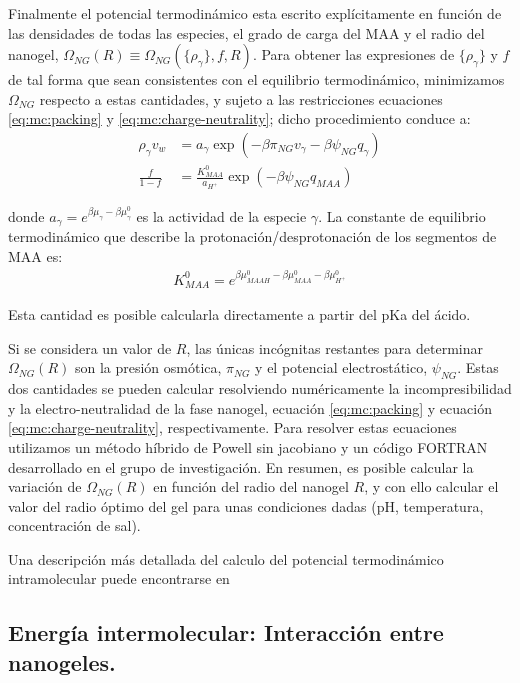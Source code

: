 	
	Finalmente el potencial termodin\'amico esta escrito expl\'icitamente en funci\'on de las densidades de todas las especies, el grado de carga del MAA y el radio del nanogel, $\Omega_{NG}(R)\equiv\Omega_{NG}(\{\rho_\gamma\},f,R)$.
	Para obtener las expresiones de $\{\rho_\gamma\}$ y $f$ de tal forma que sean consistentes con el equilibrio termodin\'amico, minimizamos $\Omega_{NG}$ respecto a estas cantidades, y  sujeto a las restricciones ecuaciones  \ref{eq:mc:packing} y  \ref{eq:mc:charge-neutrality}; dicho procedimiento conduce a: 
	\begin{align}
		\rho_\gamma v_w &= a_\gamma \exp(-\beta\pi_{NG}v_\gamma -\beta\psi_{NG}q_{\gamma})\\
		\frac{f}{1-f}&= \frac{K^0_{MAA}}{a_{H^+}}\exp(-\beta\psi_{NG}q_{MAA})\label{eq:mc:fcharge}
	\end{align}
	
	\noindent donde $a_\gamma = e^{\beta\mu_\gamma-\beta\mu_\gamma^0}$ es la actividad de la especie $\gamma$. 
	La constante de equilibrio termodin\'amico que describe la protonaci\'on/desprotonaci\'on de los segmentos de MAA es:
	\begin{align}
		K^0_{MAA}= e^{\beta\mu^0_{MAAH}-\beta\mu^0_{MAA}-\beta\mu^0_{H^+}}
	\end{align}
	
	\noindent Esta cantidad es posible calcularla directamente a partir del pKa del \'acido.
	
	
	Si se considera  un valor de  $R$, las \'unicas inc\'ognitas restantes para determinar $\Omega_{NG}(R)$ son la presi\'on osm\'otica, $\pi_{NG}$ y el potencial electrost\'atico, $\psi_{NG}$.
	Estas dos cantidades se pueden calcular resolviendo num\'ericamente la incompresibilidad y la electro-neutralidad de la fase nanogel, ecuaci\'on \ref{eq:mc:packing} y ecuaci\'on \ref{eq:mc:charge-neutrality}, respectivamente.
	Para resolver estas ecuaciones utilizamos un m\'etodo h\'ibrido de Powell sin jacobiano y un c\'odigo FORTRAN desarrollado en el grupo de investigaci\'on.
	En resumen, es posible calcular la variaci\'on de  $\Omega_{NG}(R)$ en funci\'on del radio del nanogel $R$, y con ello calcular el valor del radio \'optimo del gel para unas condiciones dadas (pH, temperatura, concentraci\'on de sal).
	
	Una descripci\'on m\'as detallada del calculo del potencial termodin\'amico intramolecular puede encontrarse en \cite{perez2021thermodynamic}
	
	\subsection{Energ\'ia intermolecular: Interacci\'on entre nanogeles.}\label{sec:mc:energia_intra}
	

